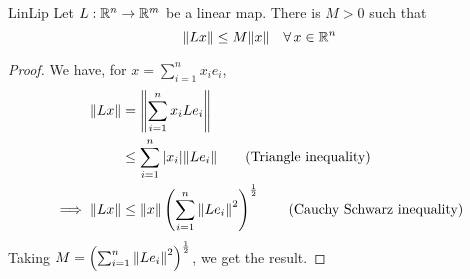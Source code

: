 \documentclass[../Analysis-3.tex]{subfiles}
\begin{document}
\begin{Thm}{}{LinLip}
  Let $ L: \mathbb{R}^n \to \mathbb{R}^m $ be a linear map. There is $ M > 0 $ such that
  \[ \norm{Lx} \leq M \norm{x} \quad \forall \, x \in \mathbb{R}^n \]
\end{Thm}
\begin{proof}
  We have, for $ x = \sum_{i=1}^{n}x_ie_i $,
  \begin{align*}
    \norm{Lx}
     & = \norm{\sum_{i=1}^{n} x_i Le_i}                                                                  \\
     & \leq \sum_{i=1}^{n} |x_i| \norm{Le_i} \tag{Triangle inequality}                                   \\
    \implies \norm{Lx}
     & \leq \norm{x} \left(\sum_{i=1}^{n}\norm{Le_i}^2\right)^{\frac 12} \tag{Cauchy Schwarz inequality}
  \end{align*}
  Taking $ M = \left(\sum_{i=1}^{n}\norm{Le_i}^2\right)^{\frac 12} $, we get the result.
\end{proof}
\end{document}

